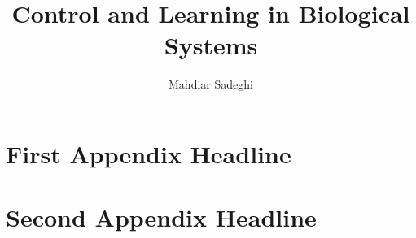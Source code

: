 \documentclass[PHD]{macro/neu}
\title{Control and Learning in Biological Systems}
\author{Mahdiar Sadeghi}
\begin{document}
\titlepage

\begin{frontmatter}



\tableofcontents
\listoffigures
\newpage\ssp
\listoftables




\end{frontmatter}
\pagestyle{headings}



%



\printbibliography

\appendix
\chapter{First Appendix Headline}
\chapter{Second Appendix Headline}
\printindex
\end{document}
